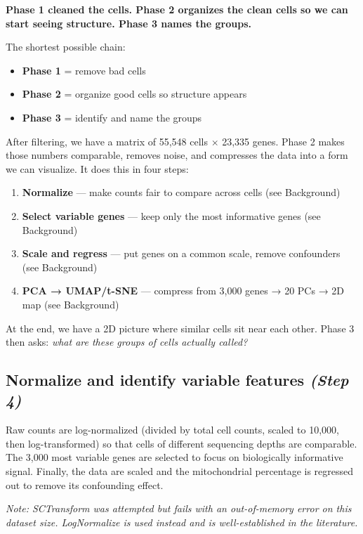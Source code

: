 \documentclass[11pt, a4paper]{article}
\begin{document}
\textbf{Phase 1 cleaned the cells. Phase 2 organizes the clean cells so we can start seeing structure. Phase 3 names the groups.}

The shortest possible chain:
\begin{itemize}[nosep]
  \item \textbf{Phase 1} = remove bad cells
  \item \textbf{Phase 2} = organize good cells so structure appears
  \item \textbf{Phase 3} = identify and name the groups
\end{itemize}

After filtering, we have a matrix of 55,548 cells $\times$ 23,335 genes.
Phase 2 makes those numbers comparable, removes noise, and compresses the data
into a form we can visualize. It does this in four steps:

\begin{enumerate}[nosep]
  \item \textbf{Normalize} — make counts fair to compare across cells (see Background)
  \item \textbf{Select variable genes} — keep only the most informative genes (see Background)
  \item \textbf{Scale and regress} — put genes on a common scale, remove confounders (see Background)
  \item \textbf{PCA → UMAP/t-SNE} — compress from 3,000 genes → 20 PCs → 2D map (see Background)
\end{enumerate}

At the end, we have a 2D picture where similar cells sit near each other.
Phase 3 then asks: \textit{what are these groups of cells actually called?}

\subsection{Normalize and identify variable features \small\normalfont\textit{(Step 4)}}
Raw counts are log-normalized (divided by total cell counts, scaled to 10{,}000,
then log-transformed) so that cells of different sequencing depths are comparable.
The 3{,}000 most variable genes are selected to focus on biologically informative
signal.
Finally, the data are scaled and the mitochondrial percentage is regressed out
to remove its confounding effect.

\textit{Note: SCTransform was attempted but fails with an out-of-memory error on this dataset size. LogNormalize is used instead and is well-established in the literature.}
\end{document}

